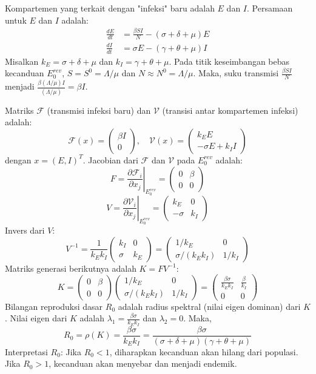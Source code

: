 \documentclass[12pt,a4paper]{article}
\begin{document}
Kompartemen yang terkait dengan "infeksi" baru adalah $E$ dan $I$.
Persamaan untuk $E$ dan $I$ adalah:
\begin{align*}
\frac{dE}{dt} &= \frac{\beta S I}{N} - (\sigma + \delta + \mu)E \\
\frac{dI}{dt} &= \sigma E - (\gamma + \theta + \mu)I
\end{align*}
Misalkan $k_E = \sigma + \delta + \mu$ dan $k_I = \gamma + \theta + \mu$.
Pada titik keseimbangan bebas kecanduan $E_0^{rev}$, $S = S^0 = \Lambda/\mu$ dan $N \approx N^0 = \Lambda/\mu$.
Maka, suku transmisi $\frac{\beta S I}{N}$ menjadi $\frac{\beta (\Lambda/\mu) I}{(\Lambda/\mu)} = \beta I$.

Matriks $\mathcal{F}$ (transmisi infeksi baru) dan $\mathcal{V}$ (transisi antar kompartemen infeksi) adalah:
$$ \mathcal{F}(x) = \begin{pmatrix} \beta I \\ 0 \end{pmatrix}, \quad \mathcal{V}(x) = \begin{pmatrix} k_E E \\ -\sigma E + k_I I \end{pmatrix} $$
dengan $x = (E, I)^T$.
Jacobian dari $\mathcal{F}$ dan $\mathcal{V}$ pada $E_0^{rev}$ adalah:
$$ F = \left. \frac{\partial \mathcal{F}_i}{\partial x_j} \right|_{E_0^{rev}} = \begin{pmatrix} 0 & \beta \\ 0 & 0 \end{pmatrix} $$
$$ V = \left. \frac{\partial \mathcal{V}_i}{\partial x_j} \right|_{E_0^{rev}} = \begin{pmatrix} k_E & 0 \\ -\sigma & k_I \end{pmatrix} $$
Invers dari $V$:
$$ V^{-1} = \frac{1}{k_E k_I} \begin{pmatrix} k_I & 0 \\ \sigma & k_E \end{pmatrix} = \begin{pmatrix} 1/k_E & 0 \\ \sigma/(k_E k_I) & 1/k_I \end{pmatrix} $$
Matriks generasi berikutnya adalah $K = FV^{-1}$:
$$ K = \begin{pmatrix} 0 & \beta \\ 0 & 0 \end{pmatrix} \begin{pmatrix} 1/k_E & 0 \\ \sigma/(k_E k_I) & 1/k_I \end{pmatrix} = \begin{pmatrix} \frac{\beta \sigma}{k_E k_I} & \frac{\beta}{k_I} \\ 0 & 0 \end{pmatrix} $$
Bilangan reproduksi dasar $R_0$ adalah radius spektral (nilai eigen dominan) dari $K$.
Nilai eigen dari $K$ adalah $\lambda_1 = \frac{\beta \sigma}{k_E k_I}$ dan $\lambda_2 = 0$.
Maka,
$$ R_0 = \rho(K) = \frac{\beta \sigma}{k_E k_I} = \frac{\beta \sigma}{(\sigma + \delta + \mu)(\gamma + \theta + \mu)} $$
Interpretasi $R_0$: Jika $R_0 < 1$, diharapkan kecanduan akan hilang dari populasi. Jika $R_0 > 1$, kecanduan akan menyebar dan menjadi endemik.
\end{document}
